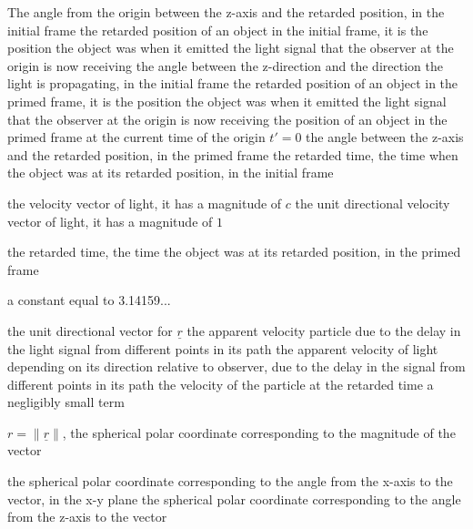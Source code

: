 {The angle from the origin between the z-axis and the retarded position, in the initial frame}
{the retarded position of an object in the initial frame, it is the position the object was when it emitted the light signal that the observer at the origin is now receiving}
\variableterm{\Talpha}{\alpha}
{the angle between the z-direction and the direction the light is propagating, in the initial frame}
{the retarded position of an object in the primed frame, it is the position the object was when it emitted the light signal that the observer at the origin is now receiving}
{the position of an object in the primed frame at the current time of the origin $t'=0$}
{the angle between the z-axis and the retarded position, in the primed frame}
{the retarded time, the time when the object was at its retarded position, in the initial frame}

{the velocity vector of light, it has a magnitude of $c$}
{the unit directional velocity vector of light, it has a magnitude of $1$}

{the retarded time, the time the object was at its retarded position, in the primed frame}

\variableterm{\Tpi}{\pi}
{a constant equal to 3.14159...}

{the unit directional vector for $\underline{r}$}
{the apparent velocity particle due to the delay in the light signal from different points in its path}
{the apparent velocity of light depending on its direction relative to observer, due to the delay in the signal from different points in its path}
{the velocity of the particle at the retarded time}
{a negligibly small term}

{$r=\|\underline{r}\|$, the spherical polar coordinate corresponding to the magnitude of the vector}

\variableterm{\Tphi}{\phi}
{the spherical polar coordinate corresponding to the angle from the x-axis to the vector, in the x-y plane}
\variableterm{\Ttheta}{\theta}
{the spherical polar coordinate corresponding to the angle from the z-axis to the vector}

